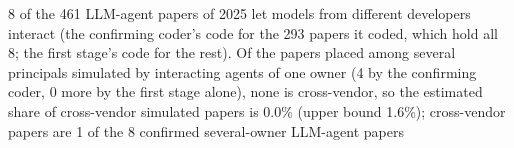 8 of the 461 LLM-agent papers of 2025 let models from different developers interact (the confirming coder's code for the 293 papers it coded, which hold all 8; the first stage's code for the rest). Of the papers placed among several principals simulated by interacting agents of one owner (4 by the confirming coder, 0 more by the first stage alone), none is cross-vendor, so the estimated share of cross-vendor simulated papers is 0.0\% (upper bound 1.6\%); cross-vendor papers are 1 of the 8 confirmed several-owner LLM-agent papers